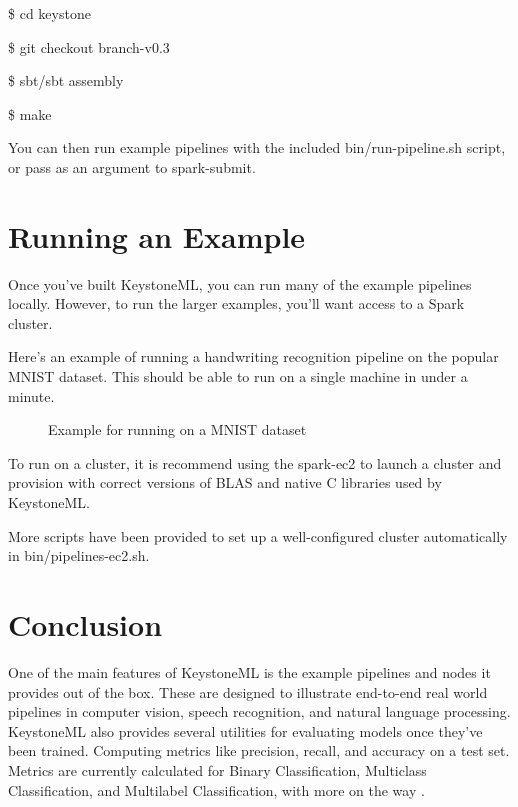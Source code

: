 \documentclass[9pt,twocolumn,twoside]{styles/osajnl}
\begin{document}
\$ cd keystone

\$ git checkout branch-v0.3

\$ sbt/sbt assembly

\$ make

You can then run example pipelines with the included
bin/run-pipeline.sh script, or pass as an argument to spark-submit.

\section{Running an Example}

Once you’ve built KeystoneML, you can run many of the example
pipelines locally. However, to run the larger examples, you’ll want
access to a Spark cluster.

Here’s an example of running a handwriting recognition pipeline on the
popular MNIST dataset. This should be able to run on a single
machine in under a minute.

\begin{figure}[htbp]
\centering
{}
\caption{Example for running on a MNIST dataset}
\label{fig:Example for running on a MNIST dataset}
\end{figure}

To run on a cluster, it is recommend using the spark-ec2 to launch a
cluster and provision with correct versions of BLAS and native C
libraries used by KeystoneML.

More scripts have been provided to set up a well-configured cluster
automatically in bin/pipelines-ec2.sh.


\section{Conclusion}

One of the main features of KeystoneML is the example pipelines and
nodes it provides out of the box. These are designed to illustrate
end-to-end real world pipelines in computer vision, speech
recognition, and natural language processing. KeystoneML also provides
several utilities for evaluating models once they’ve been
trained. Computing metrics like precision, recall, and accuracy on a
test set. Metrics are currently calculated for Binary Classification,
Multiclass Classification, and Multilabel Classification, with more on
the way \cite{www-keystoneml} .




\end{document}
